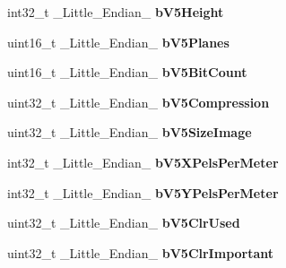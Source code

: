 \begin{DoxyCompactItemize}
\item 
\hypertarget{structGCC__ATTRIBUTE_af6341c7a55fa6b486499f581093ee119}{int32\-\_\-t \-\_\-\-Little\-\_\-\-Endian\-\_\- {\bfseries b\-V5\-Height}}\label{structGCC__ATTRIBUTE_af6341c7a55fa6b486499f581093ee119}

\item 
\hypertarget{structGCC__ATTRIBUTE_a17977888d8db36faaf50b75a8c267da4}{uint16\-\_\-t \-\_\-\-Little\-\_\-\-Endian\-\_\- {\bfseries b\-V5\-Planes}}\label{structGCC__ATTRIBUTE_a17977888d8db36faaf50b75a8c267da4}

\item 
\hypertarget{structGCC__ATTRIBUTE_ad7f9ab88dc0321803b2c90c842f4cc41}{uint16\-\_\-t \-\_\-\-Little\-\_\-\-Endian\-\_\- {\bfseries b\-V5\-Bit\-Count}}\label{structGCC__ATTRIBUTE_ad7f9ab88dc0321803b2c90c842f4cc41}

\item 
\hypertarget{structGCC__ATTRIBUTE_a08a4dee91346dadfe433d02d851f8455}{uint32\-\_\-t \-\_\-\-Little\-\_\-\-Endian\-\_\- {\bfseries b\-V5\-Compression}}\label{structGCC__ATTRIBUTE_a08a4dee91346dadfe433d02d851f8455}

\item 
\hypertarget{structGCC__ATTRIBUTE_abd622c168d1a2d4a0b01c3ebad41dabb}{uint32\-\_\-t \-\_\-\-Little\-\_\-\-Endian\-\_\- {\bfseries b\-V5\-Size\-Image}}\label{structGCC__ATTRIBUTE_abd622c168d1a2d4a0b01c3ebad41dabb}

\item 
\hypertarget{structGCC__ATTRIBUTE_aa90b07507b038fd9f6b033b0c2fa8af7}{int32\-\_\-t \-\_\-\-Little\-\_\-\-Endian\-\_\- {\bfseries b\-V5\-X\-Pels\-Per\-Meter}}\label{structGCC__ATTRIBUTE_aa90b07507b038fd9f6b033b0c2fa8af7}

\item 
\hypertarget{structGCC__ATTRIBUTE_ac4bdd65323fdb2500242e3c082926078}{int32\-\_\-t \-\_\-\-Little\-\_\-\-Endian\-\_\- {\bfseries b\-V5\-Y\-Pels\-Per\-Meter}}\label{structGCC__ATTRIBUTE_ac4bdd65323fdb2500242e3c082926078}

\item 
\hypertarget{structGCC__ATTRIBUTE_a99b6b36532e9e38fdf827517e7027c72}{uint32\-\_\-t \-\_\-\-Little\-\_\-\-Endian\-\_\- {\bfseries b\-V5\-Clr\-Used}}\label{structGCC__ATTRIBUTE_a99b6b36532e9e38fdf827517e7027c72}

\item 
\hypertarget{structGCC__ATTRIBUTE_a8e0e8f0a81bdb144c6a959297d51b963}{uint32\-\_\-t \-\_\-\-Little\-\_\-\-Endian\-\_\- {\bfseries b\-V5\-Clr\-Important}}\label{structGCC__ATTRIBUTE_a8e0e8f0a81bdb144c6a959297d51b963}


\end{DoxyCompactItemize}
